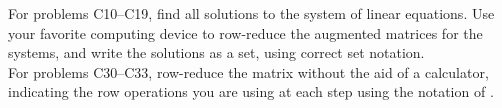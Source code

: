 %
For problems C10--C19, find all solutions to the system of linear equations.  Use your favorite computing device to row-reduce the augmented matrices for the systems, and write the solutions as a set, using correct set notation.\\
%
%
%
For problems C30--C33, row-reduce the matrix without the aid of a calculator, indicating the row operations you are using at each step using the notation of .\\
%
%
%
%
%
